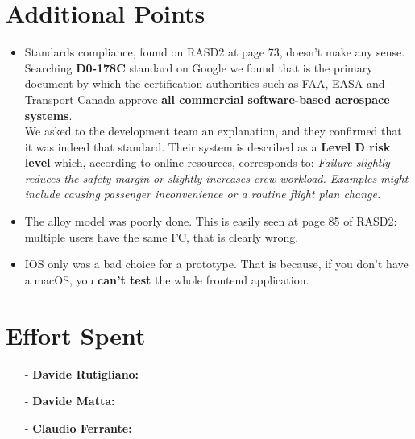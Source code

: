 \documentclass[a4paper]{article}
\begin{document}
\section{Additional Points}
\begin{itemize}
    \item Standards compliance, found on RASD2 at page 73, doesn't make any sense. Searching \textbf{D0-178C} standard on Google we found that is the primary document by which the certification authorities such as FAA, EASA and Transport Canada approve \textbf{all commercial software-based aerospace systems}.\\
    We asked to the development team an explanation, and they confirmed that it was indeed that standard.
    Their system is described as a \textbf{Level D risk level} which, according to online resources, corresponds to: \textit{Failure slightly reduces the safety margin or slightly increases crew workload. Examples might include causing passenger inconvenience or a routine flight plan change.}
    \item The alloy model was poorly done. This is easily seen at page 85 of RASD2: multiple users have the same FC, that is clearly wrong.
    \item IOS only was a bad choice for a prototype. That is because, if you don't have a macOS, you \textbf{can't test} the whole frontend application.
\end{itemize}

\newpage
\section{Effort Spent}
    \begin{itemize}
        \item[-] \textbf{Davide Rutigliano:}
        
        \item[-] \textbf{Davide Matta:}
        
        \item[-] \textbf{Claudio Ferrante:}
    \end{itemize}
\end{document}
